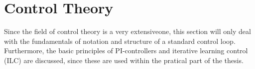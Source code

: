 
\chapter{Control Theory}
Since the field of control theory is a very extensiveone, this section will only deal with the fundamentals of notation and structure of a standard control loop. Furthermore, the basic principles of PI-controllers and  iterative learning control (ILC) are discussed, since these are used within the pratical part of the thesis.

